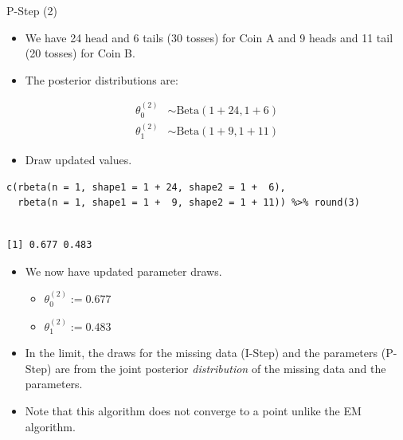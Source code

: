 \documentclass[dvipdfmx,bigger,aspectratio=169]{beamer}
\begin{document}
\begin{frame}[fragile,allowframebreaks,label=,t]{P-Step (2)}
 \begin{itemize}
\item We have 24 head and 6 tails (30 tosses) for Coin A and 9 heads and 11 tail (20 tosses) for Coin B.
\item The posterior distributions are:
\end{itemize}
\begin{align*}
  \theta_{0}^{(2)} &\sim \text{Beta}(1 + 24, 1 + 6)\\
  \theta_{1}^{(2)} &\sim \text{Beta}(1 + 9, 1 + 11)
\end{align*}
\begin{itemize}
\item Draw updated values.
\end{itemize}
\scriptsize
\begin{verbatim}
c(rbeta(n = 1, shape1 = 1 + 24, shape2 = 1 +  6),
  rbeta(n = 1, shape1 = 1 +  9, shape2 = 1 + 11)) %>% round(3)
\end{verbatim}

\begin{verbatim}

[1] 0.677 0.483
\end{verbatim}


\normalsize
\begin{itemize}
\item We now have updated parameter draws.
\begin{itemize}
\item \(\theta_{0}^{(2)} := 0.677\)
\item \(\theta_{1}^{(2)} := 0.483\)
\end{itemize}
\end{itemize}


\begin{itemize}
\item In the limit, the draws for the missing data (I-Step) and the parameters (P-Step) are from the joint posterior \emph{distribution} of the missing data and the parameters. \cite{littleStatisticalAnalysisMissing2002}
\item Note that this algorithm does not converge to a point unlike the EM algorithm.
\end{itemize}
\end{frame}
\end{document}
